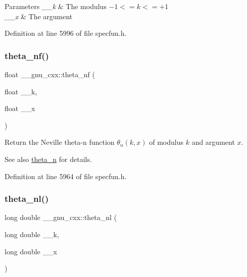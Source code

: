 \begin{DoxyParams}{Parameters}
{\em \+\_\+\+\_\+k} & The modulus $ -1 <= k <= +1 $ \\
\hline
{\em \+\_\+\+\_\+x} & The argument \\
\hline
\end{DoxyParams}


Definition at line 5996 of file specfun.\+h.

\mbox{\label{group__gnu__math__spec__func_ga5298a95e02bd909d55e59c1f2a0b51f8}} 
\subsubsection{\texorpdfstring{theta\+\_\+nf()}{theta\_nf()}}
{\footnotesize\ttfamily float \+\_\+\+\_\+gnu\+\_\+cxx\+::theta\+\_\+nf (\begin{DoxyParamCaption}\item[{float}]{\+\_\+\+\_\+k,  }\item[{float}]{\+\_\+\+\_\+x }\end{DoxyParamCaption})\hspace{0.3cm}{\ttfamily [inline]}}

Return the Neville theta-\/n function $ \theta_n(k,x) $ of modulus $ k $ and argument $ x $.

\begin{DoxySeeAlso}{See also}
\hyperlink{group__gnu__math__spec__func_ga202778bd650e04e9f3729bfca35c32e2}{theta\+\_\+n} for details. 
\end{DoxySeeAlso}


Definition at line 5964 of file specfun.\+h.

\mbox{\label{group__gnu__math__spec__func_ga907f6c147387d55d2dfccbc58d1f1bc5}} 
\subsubsection{\texorpdfstring{theta\+\_\+nl()}{theta\_nl()}}
{\footnotesize\ttfamily long double \+\_\+\+\_\+gnu\+\_\+cxx\+::theta\+\_\+nl (\begin{DoxyParamCaption}\item[{long double}]{\+\_\+\+\_\+k,  }\item[{long double}]{\+\_\+\+\_\+x }\end{DoxyParamCaption})\hspace{0.3cm}{\ttfamily [inline]}}

